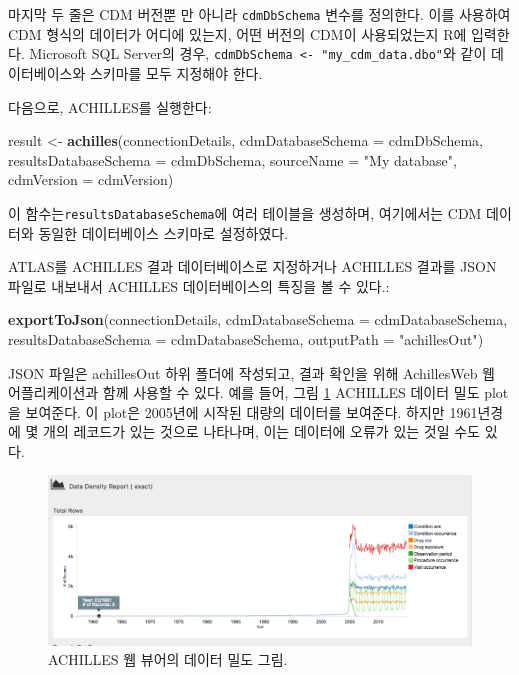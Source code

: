 \documentclass[11pt]{book}
\newenvironment{Shaded}{\begin{snugshade}}{\end{snugshade}}
\newcommand{\KeywordTok}[1]{\textcolor[rgb]{0.13,0.29,0.53}{\textbf{#1}}}
\newcommand{\DataTypeTok}[1]{\textcolor[rgb]{0.13,0.29,0.53}{#1}}
\newcommand{\StringTok}[1]{\textcolor[rgb]{0.31,0.60,0.02}{#1}}
\newcommand{\NormalTok}[1]{#1}
\theoremstyle{definition}
\theoremstyle{definition}
\theoremstyle{definition}
\theoremstyle{remark}
\begin{document}
마지막 두 줄은 CDM 버전뿐 만 아니라 \texttt{cdmDbSchema} 변수를
정의한다. 이를 사용하여 CDM 형식의 데이터가 어디에 있는지, 어떤 버전의
CDM이 사용되었는지 R에 입력한다. Microsoft SQL Server의 경우,
\texttt{cdmDbSchema\ \textless{}-\ "my\_cdm\_data.dbo"}와 같이
데이터베이스와 스키마를 모두 지정해야 한다.

다음으로, ACHILLES를 실행한다:

\begin{Shaded}
\begin{Highlighting}[]
\NormalTok{result <-}\StringTok{ }\KeywordTok{achilles}\NormalTok{(connectionDetails,}
                   \DataTypeTok{cdmDatabaseSchema =}\NormalTok{ cdmDbSchema,}
                   \DataTypeTok{resultsDatabaseSchema =}\NormalTok{ cdmDbSchema,}
                   \DataTypeTok{sourceName =} \StringTok{"My database"}\NormalTok{,}
                   \DataTypeTok{cdmVersion =}\NormalTok{ cdmVersion)}
\end{Highlighting}
\end{Shaded}

이 함수는\texttt{resultsDatabaseSchema}에 여러 테이블을 생성하며,
여기에서는 CDM 데이터와 동일한 데이터베이스 스키마로 설정하였다.

ATLAS를 ACHILLES 결과 데이터베이스로 지정하거나 ACHILLES 결과를 JSON
파일로 내보내서 ACHILLES 데이터베이스의 특징을 볼 수 있다.:

\begin{Shaded}
\begin{Highlighting}[]
\KeywordTok{exportToJson}\NormalTok{(connectionDetails,}
             \DataTypeTok{cdmDatabaseSchema =}\NormalTok{ cdmDatabaseSchema,}
             \DataTypeTok{resultsDatabaseSchema =}\NormalTok{ cdmDatabaseSchema,}
             \DataTypeTok{outputPath =} \StringTok{"achillesOut"}\NormalTok{)}
\end{Highlighting}
\end{Shaded}

JSON 파일은 achillesOut 하위 폴더에 작성되고, 결과 확인을 위해
AchillesWeb 웹 어플리케이션과 함께 사용할 수 있다. 예를 들어, 그림
\ref{fig:achillesDataDensity} ACHILLES 데이터 밀도 plot을 보여준다. 이
plot은 2005년에 시작된 대량의 데이터를 보여준다. 하지만 1961년경에 몇
개의 레코드가 있는 것으로 나타나며, 이는 데이터에 오류가 있는 것일 수도
있다.

\begin{figure}

{\centering \includegraphics[width=1\linewidth]{images/DataQuality/achillesDataDensity} 

}

\caption{ACHILLES 웹 뷰어의 데이터 밀도 그림.}\label{fig:achillesDataDensity}
\end{figure}
\end{document}
